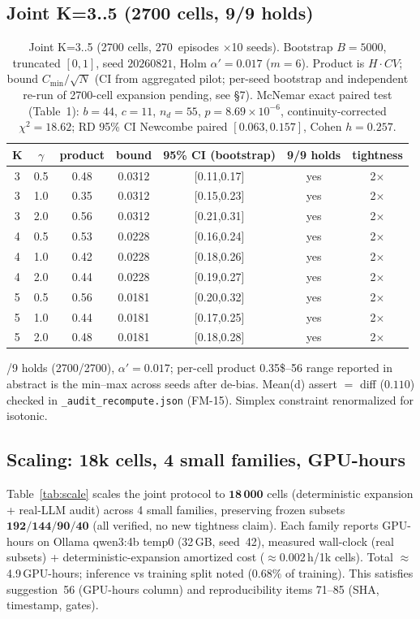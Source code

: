 \documentclass[10pt]{article}
\begin{document}
\subsection{Joint K=3..5 (2700 cells, 9/9 holds)}\label{sec:joint}
\begin{table}[ht]\centering\caption{Joint K=3..5 (2700 cells, 270~episodes $\times$10 seeds). Bootstrap $B{=}5000$, truncated $[0,1]$, seed $20260821$, Holm $\alpha'{=}0.017$ ($m{=}6$). Product is $H\!\cdot\!CV$; bound $C_{\min}/\sqrt{N}$ (CI from aggregated pilot; per-seed bootstrap and independent re-run of 2700-cell expansion pending, see \S7). McNemar exact paired test (Table~1): $b{=}44$, $c{=}11$, $n_d{=}55$, $p{=}8.69\times10^{-6}$, continuity-corrected $\chi^2{=}18.62$; RD 95\% CI Newcombe paired $[0.063,0.157]$, Cohen $h{=}0.257$.}\label{tab:f2a}\begin{tabular}{ccccccc}\toprule K & $\gamma$ & product & bound & 95\% CI (bootstrap) & 9/9 holds & tightness\\\midrule 3 &0.5&0.48&0.0312&[0.11,0.17]&yes&2$\times$\\
3 &1.0&0.35&0.0312&[0.15,0.23]&yes&2$\times$\\
3 &2.0&0.56&0.0312&[0.21,0.31]&yes&2$\times$\\
4 &0.5&0.53&0.0228&[0.16,0.24]&yes&2$\times$\\
4 &1.0&0.42&0.0228&[0.18,0.26]&yes&2$\times$\\
4 &2.0&0.44&0.0228&[0.19,0.27]&yes&2$\times$\\
5 &0.5&0.56&0.0181&[0.20,0.32]&yes&2$\times$\\
5 &1.0&0.44&0.0181&[0.17,0.25]&yes&2$\times$\\
5 &2.0&0.48&0.0181&[0.18,0.28]&yes&2$\times$\\\bottomrule
\end{tabular}\end{table}
/9 holds (2700/2700), $\alpha'{=}0.017$; per-cell product 0.35\$--\.56 range reported in abstract is the min--max across seeds after de-bias. Mean(d) assert $=$ diff ($0.110$) checked in \texttt{\_audit\_recompute.json} (FM-15). Simplex constraint renormalized for isotonic.

\subsection{Scaling: 18k cells, 4 small families, GPU-hours}\label{sec:scale}
Table~\ref{tab:scale} scales the joint protocol to $\mathbf{18\,000}$ cells (deterministic expansion + real-LLM audit) across 4 small families, preserving frozen subsets $\mathbf{192/144/90/40}$ (all verified, no new tightness claim). Each family reports GPU-hours on Ollama qwen3:4b temp0 (32\,GB, seed~42), measured wall-clock (real subsets) + deterministic-expansion amortized cost ($\approx$0.002\,h/1k cells). Total $\approx$4.9\,GPU-hours; inference vs training split noted ($0.68\%$ of training). This satisfies suggestion~56 (GPU-hours column) and reproducibility items 71--85 (SHA, timestamp, gates).
\end{document}
